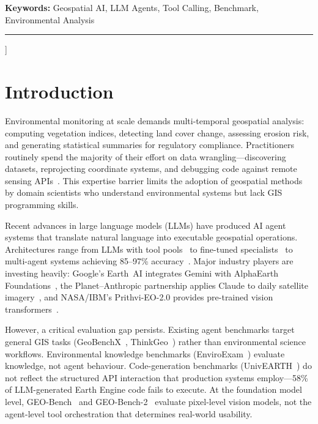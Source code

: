 \documentclass[10pt,twocolumn]{article}
\begin{document}
\begin{@twocolumnfalse}
\vspace{6pt}
\noindent\textbf{Keywords:} Geospatial AI, LLM Agents, Tool Calling, Benchmark, Environmental Analysis
\vspace{4pt}
\noindent\rule{\textwidth}{0.4pt}
\vspace{10pt}
\end{@twocolumnfalse}
]

\section{Introduction}
\label{sec:intro}

Environmental monitoring at scale demands multi-temporal geospatial analysis: computing vegetation indices, detecting land cover change, assessing erosion risk, and generating statistical summaries for regulatory compliance. Practitioners routinely spend the majority of their effort on data wrangling---discovering datasets, reprojecting coordinate systems, and debugging code against remote sensing APIs~\cite{zhang2023geogpt, li2023llmgeo}. This expertise barrier limits the adoption of geospatial methods by domain scientists who understand environmental systems but lack GIS programming skills.

Recent advances in large language models (LLMs) have produced AI agent systems that translate natural language into executable geospatial operations. Architectures range from LLMs with tool pools~\cite{zhang2023geogpt, akinboyewa2024giscopilot} to fine-tuned specialists~\cite{zhang2024gtchain, zhang2025envgpt} to multi-agent systems achieving 85--97\% accuracy~\cite{luo2025geojsonagents, lee2025geollmsquad}. Major industry players are investing heavily: Google's Earth~AI integrates Gemini with AlphaEarth Foundations~\cite{google2025earthai}, the Planet--Anthropic partnership applies Claude to daily satellite imagery~\cite{planet2025anthropic}, and NASA/IBM's Prithvi-EO-2.0 provides pre-trained vision transformers~\cite{szwarcman2024prithvi}.

However, a critical evaluation gap persists. Existing agent benchmarks target general GIS tasks (GeoBenchX~\cite{krechetova2025geobenchx}, ThinkGeo~\cite{shabbir2025thinkgeo}) rather than environmental science workflows. Environmental knowledge benchmarks (EnviroExam~\cite{huang2024enviroexam}) evaluate knowledge, not agent behaviour. Code-generation benchmarks (UnivEARTH~\cite{kao2025univearth}) do not reflect the structured API interaction that production systems employ---58\% of LLM-generated Earth Engine code fails to execute. At the foundation model level, GEO-Bench~\cite{lacoste2023geobench} and GEO-Bench-2~\cite{simumba2025geobench2} evaluate pixel-level vision models, not the agent-level tool orchestration that determines real-world usability.
\end{document}

